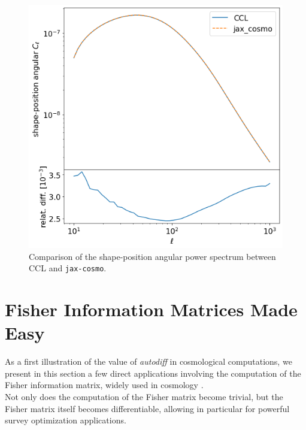 \documentclass[twocolumn,twocolappendix,nofootinbib,iop]{openjournal}
\newcommand{\jaxcosmo}{\texttt{jax-cosmo}}
\begin{document}
\begin{figure}
    \centering
    \includegraphics[width=\columnwidth]{figures/comp_Cell_shape_pos.png}
    \caption{Comparison of the shape-position angular power spectrum between CCL and \jaxcosmo.} 
    \label{fig:Cell_comparison}
\end{figure}


\section{Fisher Information Matrices Made Easy}
\label{sec-fisher-forecast}

As a first illustration of the value of \textit{autodiff} in cosmological computations, we present in this section a few direct applications involving the computation of the Fisher information matrix, widely used in cosmology \citep{1997ApJ...480...22T,Stuart1991}. \\
Not only does the computation of the Fisher matrix become trivial, but the Fisher matrix itself becomes differentiable, allowing in particular for powerful survey optimization applications.

\end{document}
